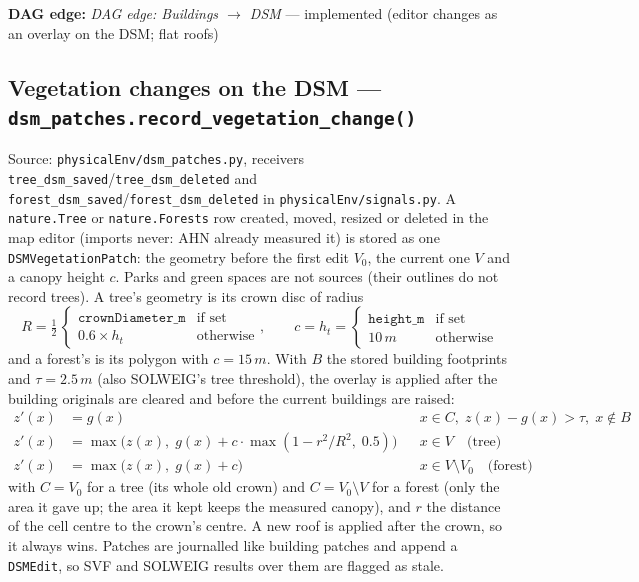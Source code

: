 \documentclass[11pt]{article}
\newcommand{\code}[1]{\texttt{#1}}
\newcommand{\dagedge}[1]{\textit{DAG edge: #1}}
\newcommand{\statusdone}{\textcolor{green!50!black}{implemented}}
\begin{document}
\textbf{DAG edge:} \dagedge{Buildings $\rightarrow$ DSM} --- \statusdone{} (editor changes as an overlay on the DSM; flat roofs)

\subsection{Vegetation changes on the DSM --- \code{dsm\_patches.record\_vegetation\_change()}}
\label{sec:dsm-vegetation}
Source: \code{physicalEnv/dsm\_patches.py}, receivers \code{tree\_dsm\_saved}/\code{tree\_dsm\_deleted} and \code{forest\_dsm\_saved}/\code{forest\_dsm\_deleted} in \code{physicalEnv/signals.py}. A \code{nature.Tree} or \code{nature.Forests} row created, moved, resized or deleted in the map editor (imports never: AHN already measured it) is stored as one \code{DSMVegetationPatch}: the geometry before the first edit $V_0$, the current one $V$ and a canopy height $c$. Parks and green spaces are not sources (their outlines do not record trees). A tree's geometry is its crown disc of radius
\begin{equation}
  R = \tfrac{1}{2}\,\begin{cases} \code{crownDiameter\_m} & \text{if set} \\ 0.6 \times h_t & \text{otherwise} \end{cases}, \qquad c = h_t = \begin{cases} \code{height\_m} & \text{if set} \\ 10\,\si{m} & \text{otherwise} \end{cases}
\end{equation}
and a forest's is its polygon with $c = 15\,\si{m}$. With $B$ the stored building footprints and $\tau = 2.5\,\si{m}$ (also SOLWEIG's tree threshold), the overlay is applied after the building originals are cleared and before the current buildings are raised:
\begin{align}
  z'(x) &= g(x) && x \in C,\; z(x) - g(x) > \tau,\; x \notin B \\
  z'(x) &= \max\!\big(z(x),\; g(x) + c \cdot \max(1 - r^2/R^2,\; 0.5)\big) && x \in V \quad \text{(tree)} \\
  z'(x) &= \max\big(z(x),\; g(x) + c\big) && x \in V \setminus V_0 \quad \text{(forest)}
\end{align}
with $C = V_0$ for a tree (its whole old crown) and $C = V_0 \setminus V$ for a forest (only the area it gave up; the area it kept keeps the measured canopy), and $r$ the distance of the cell centre to the crown's centre. A new roof is applied after the crown, so it always wins. Patches are journalled like building patches and append a \code{DSMEdit}, so SVF and SOLWEIG results over them are flagged as stale.
\end{document}
